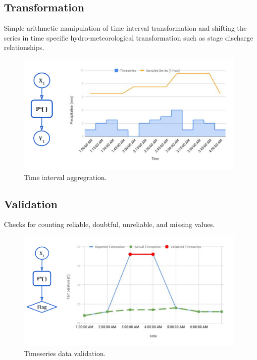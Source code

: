 \subsection{Transformation}
Simple arithmetic manipulation of time interval transformation and shifting the series in time specific hydro-meteorological transformation such as stage discharge relationships.
\begin{figure}[htp]
    \centering
    \includegraphics[width=1.0\textwidth]{method/data_preprocess/transformation.pdf}
    \caption{Time interval aggregration.}
    \label{fi:transformation}
\end{figure}

\subsection{Validation}
Checks for counting reliable, doubtful, unreliable, and missing values.
\begin{figure}[htp]
    \centering
    \includegraphics[width=1.0\textwidth]{method/data_preprocess/validation.pdf}
    \caption{Timeseries data validation.}
    \label{fi:validation}
\end{figure}

